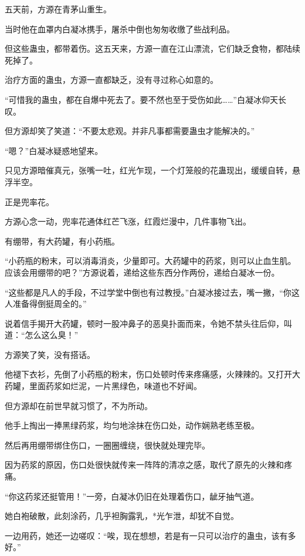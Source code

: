 
\begin{this_body}

五天前，方源在青茅山重生。

当时他在血罩内白凝冰携手，屠杀中倒也匆匆收缴了些战利品。

但这些蛊虫，都带着伤。这五天来，方源一直在江山漂流，它们缺乏食物，都陆续死掉了。

治疗方面的蛊虫，方源一直都缺乏，没有寻过称心如意的。

“可惜我的蛊虫，都在自爆中死去了。要不然也至于受伤如此……”白凝冰仰天长叹。

但方源却笑了笑道：“不要太悲观。并非凡事都需要蛊虫才能解决的。”

“嗯？”白凝冰疑惑地望来。

只见方源暗催真元，张嘴一吐，红光乍现，一个灯笼般的花蛊现出，缓缓自转，悬浮半空。

正是兜率花。

方源心念一动，兜率花通体红芒飞涨，红霞烂漫中，几件事物飞出。

有绷带，有大药罐，有小药瓶。

“小药瓶的粉末，可以消毒消炎，少量即可。大药罐中的药浆，则可以止血生肌。应该会用绷带的吧？”方源说着，递给这些东西分作两份，递给白凝冰一份。

“这些都是凡人的手段，不过学堂中倒也有过教授。”白凝冰接过去，嘴一撇，“你这人准备得倒挺周全的。”

说着信手揭开大药罐，顿时一股冲鼻子的恶臭扑面而来，令她不禁头往后仰，叫道：“怎么这么臭！”

方源笑了笑，没有搭话。

他褪下衣衫，先倒了小药瓶的粉末，伤口处顿时传来疼痛感，火辣辣的。又打开大药罐，里面药浆如烂泥，一片黑绿色，味道也不好闻。

但方源却在前世早就习惯了，不为所动。

他手上掏出一捧黑绿药浆，均匀地涂抹在伤口处，动作娴熟老练至极。

然后再用绷带绑住伤口，一圈圈缠绕，很快就处理完毕。

因为药浆的原因，伤口处很快就传来一阵阵的清凉之感，取代了原先的火辣和疼痛。

“你这药浆还挺管用！”一旁，白凝冰仍旧在处理着伤口，龇牙抽气道。

她白袍破散，此刻涂药，几乎袒胸露乳，*光乍泄，却犹不自觉。

一边用药，她还一边嗟叹：“唉，现在想想，若是有一只可以治疗的蛊虫，该有多好。”


\end{this_body}
